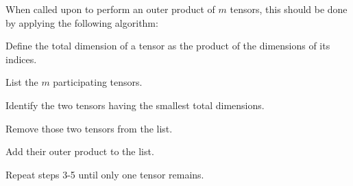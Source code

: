 When called upon to perform an outer product of $m$ tensors, this should be done by applying the following algorithm:
\begin{description}[align=left,font=\normalfont]
\item[1] Define the total dimension of a tensor as the product of the dimensions of its indices.
\item[2] List the $m$ participating tensors.
\item[3] Identify the two tensors having the smallest total dimensions.
\item[4] Remove those two tensors from the list.
\item[5] Add their outer product to the list.
\item[6] Repeat steps 3-5 until only one tensor remains.
\end{description}
